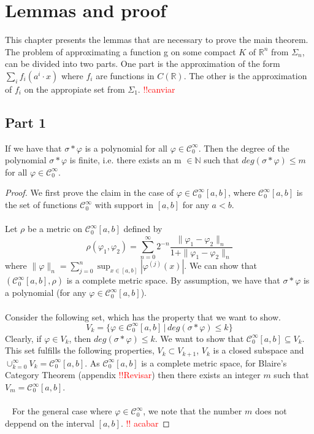 \documentclass[../main.tex]{subfiles}
\begin{document}
	\chapter{Lemmas and proof} \label{ch:proof}
	\noindent  This chapter presents the lemmas that are necessary to prove the main theorem. The problem of approximating a function g on some compact $K$ of $\mathbb{R}^n$ from $\Sigma_n$, can be divided into two parts. One part is the approximation of the form $\sum_i f_i(a^i \cdot x)$ where $f_i$ are functions in $C(\mathbb{R})$. The other is the approximation of $f_i$ on the appropiate set from $\Sigma_1$. \textcolor{red}{!!canviar}
	\section{Part 1}
	\begin{lema}  %
		If we have that $\sigma \ast \varphi $ is a polynomial for all $\varphi \in \mathcal{C}^\infty_0 $.  Then the degree of the polynomial $\sigma \ast \varphi $ is finite, i.e. there exists an m $\in \mathbb{N}$ such that $ deg (\sigma \ast \varphi) \leq m$ for all $\varphi \in \mathcal{C}^\infty_0$. 
	\end{lema}
	\begin{proof}
		We first prove the claim in the case of $\varphi \in \mathcal{C}^\infty_0[a,b]$, where $\mathcal{C}^\infty_0[a,b]$ is the set of functions $\mathcal{C}^\infty_0$ with support in $[a,b]$ for any $a<b$. \\ \\ Let $\rho$ be a metric on $\mathcal{C}^\infty_0[a,b]$ defined by
		$$\rho(\varphi_1,\varphi_2) = \sum_{n=0}^\infty 2^{-n}  \frac{\|\varphi_1 -\varphi_2\|_n}{1+\|\varphi_1 -\varphi_2\|_n}$$ where $\|\varphi\|_n= \sum_{j=0}^n \sup_{x\in [a,b]} | \varphi^{(j)}(x)| $. We can show that $(\mathcal{C}^\infty_0[a,b],\rho)$  is a complete metric space. By assumption, we have that $\sigma \ast \varphi$ is a polynomial (for any $\varphi \in \mathcal{C}^\infty_0[a,b]$). \\ \\  Consider the following set, which has the property that we want to show.  \\ $$V_k= \{\varphi \in \mathcal{C}_0^\infty[a,b] \, | \,  deg(\sigma \ast \varphi ) \leq k\}$$ Clearly, if $\varphi \in V_k$, then $deg(\sigma \ast \varphi) \leq k.$ We want to show that $\mathcal{C}_0^\infty[a,b] \subseteq V_k.$ This set fulfills the following properties, $V_k \subset V_{k+1}$, $V_k $ is a closed subspace and $\cup_{k=0}^\infty V_k = \mathcal{C}_0^\infty[a,b]$. As $\mathcal{C}_0^\infty[a,b]$ is a complete metric space, for Blaire's Category Theorem (appendix \textcolor{red}{!!Revisar}) then there exists an integer $m$ such that $V_m=\mathcal{C}_0^\infty[a,b]$. \\ \\ 
		For the general case where $\varphi \in \mathcal{C}_0^\infty$, we note that the number $m$ does not deppend on the interval $[a,b]$.   \textcolor{red}{!! acabar}

	\end{proof}
\end{document}
